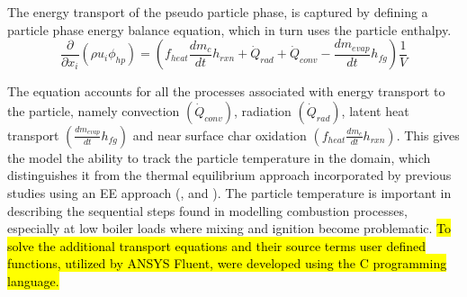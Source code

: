 \documentclass[twocolumn,10pt]{asme2ej}
\begin{document}
The energy transport of the pseudo particle phase, is captured by defining a particle phase energy balance equation, which in turn uses the particle enthalpy.
\begin{equation}\label{eqn_phi_hp}
\frac{\partial}{\partial x_{i}}( \rho u_{i} \phi_{hp} )=\left( f_{heat}\frac{dm_{c}}{dt}h_{rxn} + \dot{Q}_{rad} + \dot{Q}_{conv} - \frac{dm_{evap}}{dt}h_{fg} \right) \frac{1}{V} 
\end{equation}

The equation accounts for all the processes associated with energy transport to the particle, namely convection $\left(\dot{Q}_{conv}\right)$, radiation $\left(\dot{Q}_{rad}\right)$, latent heat transport $\left(\frac{dm_{evap}}{dt}h_{fg}\right)$ and near surface char oxidation $\left(f_{heat}\frac{dm_{c}}{dt}h_{rxn}\right)$. This gives the model the ability to track the particle temperature in the domain, which distinguishes it from the thermal equilibrium approach incorporated by previous studies using an EE approach (\cite{Benim2005}, \cite{Vicente2003} and \cite{Cai2015}). The particle temperature is important in describing the sequential steps found in modelling combustion processes, especially at low boiler loads where mixing and ignition become problematic. \hl{To solve the additional transport equations and their source terms user defined functions, utilized by ANSYS Fluent, were developed using the C programming language.}
\end{document}
